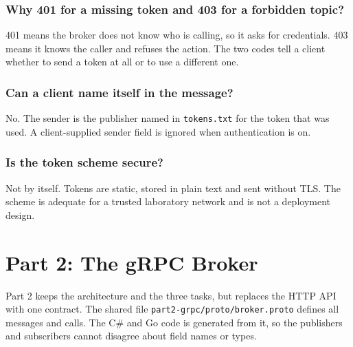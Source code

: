 \documentclass[12pt,a4paper]{article}
\begin{document}
\subsubsection{Why 401 for a missing token and 403 for a forbidden topic?}
401 means the broker does not know who is calling, so it asks for credentials.
403 means it knows the caller and refuses the action. The two codes tell a client
whether to send a token at all or to use a different one.

\subsubsection{Can a client name itself in the message?}
No. The sender is the publisher named in \texttt{tokens.txt} for the token that
was used. A client-supplied sender field is ignored when authentication is on.

\subsubsection{Is the token scheme secure?}
Not by itself. Tokens are static, stored in plain text and sent without TLS. The
scheme is adequate for a trusted laboratory network and is not a deployment
design.

\section{Part 2: The gRPC Broker}
Part 2 keeps the architecture and the three tasks, but replaces the HTTP API with
one contract. The shared file \texttt{part2-grpc/proto/broker.proto} defines all
messages and calls. The C\# and Go code is generated from it, so the publishers
and subscribers cannot disagree about field names or types.
\end{document}
